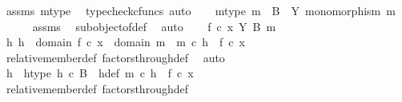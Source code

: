 \begin{isabellebody}
\ assms\ m{\isacharunderscore}{\kern0pt}type\ \isamarkupfalse%
\ {\isacharparenleft}{\kern0pt}typecheck{\isacharunderscore}{\kern0pt}cfuncs{\isacharcomma}{\kern0pt}\ auto{\isacharparenright}{\kern0pt}\isanewline
{}\isamarkupfalse%
\isanewline
\ \ \isamarkupfalse%
\ m{\isacharunderscore}{\kern0pt}type{\isacharcolon}{\kern0pt}\ {\isachardoublequoteopen}m\ {\isacharcolon}{\kern0pt}\ B\ {\isasymrightarrow}\ Y{\isachardoublequoteclose}\ {\isachardoublequoteopen}monomorphism\ m{\isachardoublequoteclose}\isanewline
\ \ \ \ \isamarkupfalse%
\ assms{\isacharparenleft}{\kern0pt}{}{\isacharparenright}{\kern0pt}\ \isamarkupfalse%
\ subobject{\isacharunderscore}{\kern0pt}of{\isacharunderscore}{\kern0pt}def{}\ \isamarkupfalse%
\ auto\isanewline
\isanewline
\ \ \isamarkupfalse%
\ {\isachardoublequoteopen}f\ {\isasymcirc}\isactrlsub c\ x\ {\isasymin}\isactrlbsub Y\isactrlesub \ {\isacharparenleft}{\kern0pt}B{\isacharcomma}{\kern0pt}\ m{\isacharparenright}{\kern0pt}{\isachardoublequoteclose}\isanewline
\ \ \isamarkupfalse%
\ \isamarkupfalse%
\ {\isachardoublequoteopen}{\isasymexists}h{\isachardot}{\kern0pt}\ h\ {\isacharcolon}{\kern0pt}\ domain\ {\isacharparenleft}{\kern0pt}f\ {\isasymcirc}\isactrlsub c\ x{\isacharparenright}{\kern0pt}\ {\isasymrightarrow}\ domain\ m\ {\isasymand}\ m\ {\isasymcirc}\isactrlsub c\ h\ {\isacharequal}{\kern0pt}\ f\ {\isasymcirc}\isactrlsub c\ x{\isachardoublequoteclose}\isanewline
\ \ \ \ \isamarkupfalse%
\ relative{\isacharunderscore}{\kern0pt}member{\isacharunderscore}{\kern0pt}def{}\ factors{\isacharunderscore}{\kern0pt}through{\isacharunderscore}{\kern0pt}def\ \isamarkupfalse%
\ auto\isanewline
\ \ \isamarkupfalse%
\ \isamarkupfalse%
\ h\ \ h{\isacharunderscore}{\kern0pt}type{\isacharcolon}{\kern0pt}\ {\isachardoublequoteopen}h\ {\isasymin}\isactrlsub c\ B{\isachardoublequoteclose}\ \ h{\isacharunderscore}{\kern0pt}def{\isacharcolon}{\kern0pt}\ {\isachardoublequoteopen}m\ {\isasymcirc}\isactrlsub c\ h\ {\isacharequal}{\kern0pt}\ f\ {\isasymcirc}\isactrlsub c\ x{\isachardoublequoteclose}\isanewline
\ \ \ \ \isamarkupfalse%
\ relative{\isacharunderscore}{\kern0pt}member{\isacharunderscore}{\kern0pt}def{}\ factors{\isacharunderscore}{\kern0pt}through{\isacharunderscore}{\kern0pt}def\ \isanewline
\ \ \ \ \isamarkupfalse%

\end{isabellebody}

